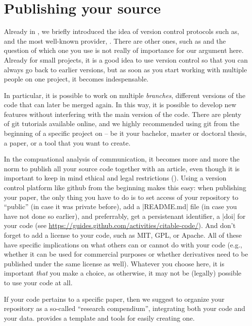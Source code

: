 \section{Publishing your source}
\label{sec:publishingsource}

Already in , we briefly introduced the idea of
version control protocols such as, and the most well-known
provider, . There are other ones, such as 
and the question of which one you use is not really of importance for our
argument here. Already for small projects, it is a good idea to use
version control so that you can always go back to earlier versions,
but as soon as you start working with multiple people on one project,
it becomes indespensable.

In particular, it is possible to work on multiple \emph{branches},
different versions of the code that can later be merged again. In this
way, it is possible to develop new features without interfering with
the main version of the code. There are plenty of git tutorials
available online, and we highly recommended using git from the
beginning of a specific project on -- be it your bachelor, master or doctoral thesis, a paper, or a tool that you want to create.

In the compuational analysis of communication, it becomes more and
more the norm to publish all your source code together with an
article, even though it is important to keep in mind ethical and legal
restrictions (\cite{VanAtteveldt2019}). Using a version control
platform like github from the beginning makes this easy: when
publishing your paper, the only thing you have to do is to set access
of your repository to ``public'' (in case it was private before), add
a |README.md| file (in case you have not done so earlier), and
preferrably, get a persistenant identifier, a |doi| for your
code (see \url{https://guides.github.com/activities/citable-code/}).
And don't forget to add a license to your code, such as MIT, GPL, or
Apache. All of these have specific implications on what others can or
cannot do with your code (e.g., whether it can be used for commercial
purposes or whether derivatives need to be published under the same license as well). Whatever you choose here, it is important \emph{that} you make a choice, as otherwise, it may not be (legally) possible to use
your code at all. 

If your code pertains to a specific paper, then we suggest to organize
your repository as a so-called ``research compendium'', integrating
both your code and your data.
\cite{compendium} provides a template and tools for easily creating one.

